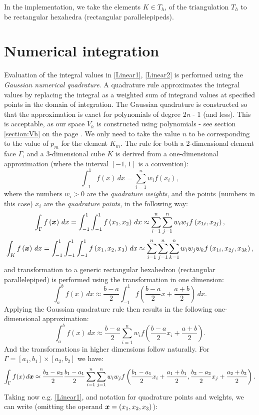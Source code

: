 In the implementation, we take the elements $K \in T_h$, of the triangulation $T_h$ to be rectangular hexahedra (rectangular parallelepipeds).
\section{Numerical integration}
Evaluation of the integral values in \ref{Linear1}, \ref{Linear2} is performed using the \textit{Gaussian numerical quadrature}. A quadrature rule approximates the integral values by replacing the integral as a weighted sum of integrand values at specified points in the domain of integration. The Gaussian quadrature is constructed so that the approximation is exact for polynomials of degree 2\textit{n} - 1 (and less). This is acceptable, as our space $V_h$ is constructed using polynomials - see section \ref{section:Vh} on the page \pageref{section:Vh}. We only need to take the value $n$ to be corresponding to the value of $p_m$ for the element $K_m$. The rule for both a 2-dimensional element face $\Gamma$, and a 3-dimensional cube $K$ is derived from a one-dimensional approximation (where the interval $\left[-1, 1\right]$ is a convention):
$$
\int_{-1}^1 f(x)\,dx = \sum_{i=1}^n w_i f(x_i),
$$
where the numbers $w_i > 0$ are the \textit{quadrature weights}, and the points (numbers in this case) $x_i$ are the \textit{quadrature points}, in the following way:
$$
\int_{\Gamma} f\left(\mbox{\boldmath $x$}\right)\,dx = \int_{-1}^{1}\int_{-1}^{1} f\left( x_1, x_2\right)\,dx \approx \sum_{i=1}^n\sum_{j=1}^n w_i w_j f\left( x_{1i}, x_{2j}\right),
$$
$$
\int_{K} f\left(\mbox{\boldmath $x$}\right)\,dx = \int_{-1}^{1}\int_{-1}^{1}\int_{-1}^{1} f\left( x_1, x_2, x_3\right)\,dx \approx \sum_{i=1}^n\sum_{j=1}^n\sum_{k=1}^n w_i w_j w_k f\left( x_{1i}, x_{2j}, x_{3k}\right),
$$
and transformation to a generic rectangular hexahedron (rectangular parallelepiped) is performed using the transformation in one dimension:
$$
\int_a^b f(x)\,dx \approx \frac{b-a}{2} \int_{-1}^1 f\left(\frac{b-a}{2}x + \frac{a+b}{2}\right)\,dx.
$$
Applying the Gaussian quadrature rule then results in the following one-dimensional approximation:
$$
\int_a^b f(x)\,dx \approx \frac{b-a}{2} \sum_{i=1}^n w_i f\left(\frac{b-a}{2}x_i + \frac{a+b}{2}\right).
$$
And the transformations in higher dimensions follow naturally. For $\Gamma = \left[a_1, b_1\right] \times \left[a_2, b_2\right]$ we have:
$$
\int_{\Gamma} f(x)\,d\mbox{\boldmath $x$} \approx \frac{b_2-a_2}{2}\frac{b_1-a_1}{2} \sum_{i=1}^n \sum_{j=1}^n w_i w_j f\left(\frac{b_1-a_1}{2}x_i + \frac{a_1+b_1}{2},\frac{b_2-a_2}{2}x_j + \frac{a_2+b_2}{2}\right).
$$
Taking now e.g. \ref{Linear1}, and notation for quadrature points and weights, we can write (omitting the operand $\mbox{\boldmath $x$} = \left( x_1, x_2, x_3\right)$):
